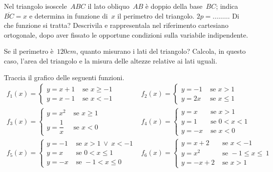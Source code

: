 \begin{esercizio}
\label{ese:\thechapter.62}
Nel triangolo isoscele~${ABC}$ il lato obliquo~${AB}$ è doppio della base~${BC}$; indica~$\overline{BC}=x$ e determina in funzione
di~$x$ il perimetro del triangolo. $2p=\ldots \ldots \ldots$
Di che funzione si tratta? Descrivila e rappresentala nel riferimento cartesiano ortogonale, dopo aver fissato le opportune condizioni
sulla variabile indipendente.

Se il perimetro è~$120\unit{cm}$, quanto misurano i lati del triangolo?
Calcola, in questo caso, l'area del triangolo e la misura delle altezze relative ai lati uguali.
\end{esercizio}
\pagebreak
\begin{esercizio} %
\label{ese:\thechapter.63}
Traccia il grafico delle seguenti funzioni.
\[
\begin{array}{ll}
f_1(x)=
\begin{cases}
y=x+1 & \text{ se } x\ge -1\\
y=x-1 & \text{ se } x< -1
\end{cases}&
f_2(x)=
\begin{cases}
y=-1 & \text{ se } x>1\\
y=2x & \text{ se } x \le 1
\end{cases}\\

f_3(x)=
\begin{cases}
y=x^2 & \text{ se } x\ge 1\\
y=\dfrac{1}{x} & \text{ se } x<0
\end{cases}&

f_4(x)=
\begin{cases}
y=x & \text{ se } x>1\\
y=1 & \text{ se } 0<x<1\\
y=-x & \text{ se } x<0
\end{cases}\\

f_5(x)=
\begin{cases}
y=-1 & \text{ se } x>1~\vee~x<-1\\
y=x & \text{ se } 0<x\le 1\\
y=-x & \text{ se } -1<x\le 0
\end{cases}&

f_6(x)=
\begin{cases}
y=x+2 & \text{ se } x<-1\\
y=x^2 & \text{ se } -1\le x\le~1\\
y=-x+2 & \text{ se } x>1
\end{cases}\\


\end{array}\]
\end{esercizio}
